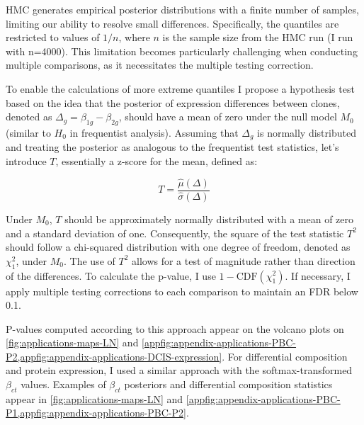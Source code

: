 \ac{HMC} generates empirical posterior distributions with a finite number of samples, limiting our ability to resolve small differences. Specifically, the quantiles are restricted to values of $1/n$, where $n$ is the sample size from the \ac{HMC} run (I run with n=4000). This limitation becomes particularly challenging when conducting multiple comparisons, as it necessitates the multiple testing correction. 

To enable the calculations of more extreme quantiles I propose a hypothesis test based on the idea that the posterior of expression differences between clones, denoted as $\Delta_g = \beta_{1g} - \beta_{2g}$, should have a mean of zero under the null model $M_0$ (similar to $H_0$ in frequentist analysis). Assuming that $\Delta_g$ is normally distributed and treating the posterior as analogous to the frequentist test statistics, let's introduce $T$, essentially a z-score for the mean, defined as:

\begin{equation}
    T = \frac{\hat{\mu}(\Delta)}{\hat{\sigma}(\Delta)}
\end{equation}


Under $M_0$, $T$ should be approximately normally distributed with a mean of zero and a standard deviation of one. Consequently, the square of the test statistic $T^2$ should follow a chi-squared distribution with one degree of freedom, denoted as $\chi^2_1$, under $M_0$. The use of $T^2$ allows for a test of magnitude rather than direction of the differences. To calculate the p-value, I use $1 - \text{CDF}(\chi^2_1)$. If necessary, I apply multiple testing corrections to each comparison to maintain an \acs{FDR} below 0.1.

P-values computed according to this approach appear on the volcano plots on \cref{fig:applications-maps-LN} and \cref{appfig:appendix-applications-PBC-P2,appfig:appendix-applications-DCIS-expression}. For differential composition and protein expression, I used a similar approach with the softmax-transformed $\beta_{ct}$ values. Examples of $\beta_{ct}$ posteriors and differential composition statistics appear in \cref{fig:applications-maps-LN} and \cref{appfig:appendix-applications-PBC-P1,appfig:appendix-applications-PBC-P2}. 

